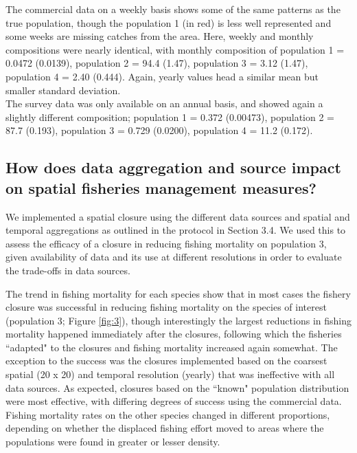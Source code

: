 \documentclass[review]{elsarticle}
\begin{document}
The commercial data on a weekly basis shows some of the same patterns as the
true population, though the population 1 (in red) is less well represented and
some weeks are missing catches from the area. Here, weekly and monthly
compositions were nearly identical, with monthly composition of population 1 =
0.0472 (0.0139), population 2 = 94.4 (1.47), population 3 = 3.12 (1.47),
population 4 = 2.40 (0.444). Again, yearly values head a similar mean but
smaller standard deviation.\\

The survey data was only available on an annual basis, and showed again a
slightly different composition; population 1 = 0.372 (0.00473), population 2 =
87.7 (0.193), population 3 = 0.729 (0.0200), population 4 = 11.2 (0.172).

\subsection{How does data aggregation and source impact on spatial fisheries
	management measures?}

We implemented a spatial closure using the different data sources and spatial
and temporal aggregations as outlined in the protocol in Section 3.4. We used
this to assess the efficacy of a closure in reducing fishing mortality on
population 3, given availability of data and its use at different resolutions in
order to evaluate the trade-offs in data sources. 

The trend in fishing mortality for each species show that in most cases the
fishery closure was successful in reducing fishing mortality on the species of
interest (population 3; Figure \ref{fig:3}), though interestingly the largest
reductions in fishing mortality happened immediately after the closures,
following which the fisheries ``adapted" to the closures and fishing mortality
increased again somewhat. The exception to the success was the closures
implemented based on the coarsest spatial (20 x 20) and temporal resolution
(yearly) that was ineffective with all data sources. As expected, closures
based on the ``known" population distribution were most effective, with
differing degrees of success using the commercial data. Fishing mortality rates
on the other species changed in different proportions, depending on whether the
displaced fishing effort moved to areas where the populations were found in
greater or lesser density. \\
\end{document}
